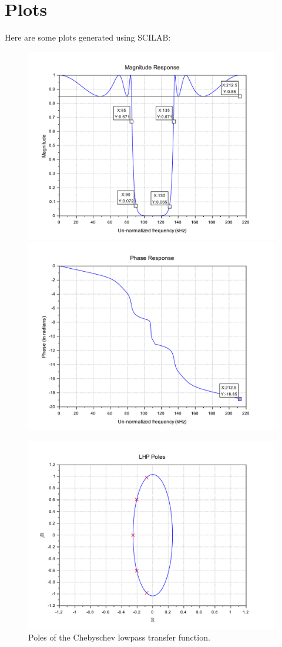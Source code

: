 \documentclass[12pt]{article}
\begin{document}
\section{Plots}
Here are some plots generated using SCILAB:
\begin{figure}[!h]
    \centering
    \includegraphics[scale=0.6]{mag.pdf}
    \quad
    \includegraphics[scale=0.6]{phase.pdf}
\end{figure}
\begin{figure}[!h]
    \centering
    \includegraphics[scale=0.6]{poles.pdf}
    \caption{Poles of the Chebyschev lowpass transfer function.}
\end{figure}
\end{document}
